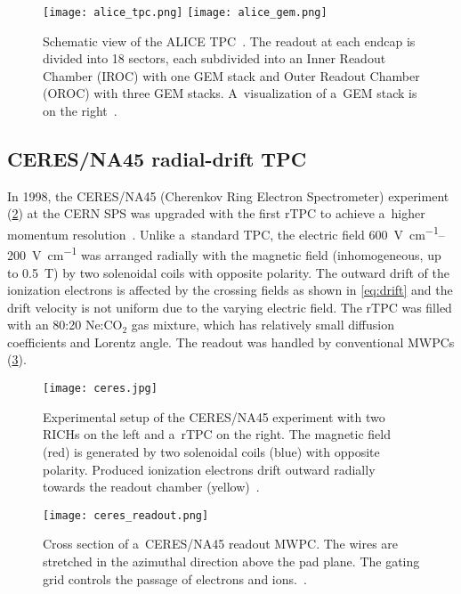 			\begin{figure}
				\centering
				\texttt{[image: alice\_tpc.png]}
				\hfill
				\texttt{[image: alice\_gem.png]}
				\caption{Schematic view of the ALICE \ac{TPC}~\cite{ALICE_upgrade2}. The readout at each endcap is divided into 18 sectors, each subdivided into an Inner Readout Chamber (IROC) with one \ac{GEM} stack and Outer Readout Chamber (OROC) with three \ac{GEM} stacks. A~visualization of a~\ac{GEM} stack is on the right~\cite{ALICE_gem}.}
				\label{fig:alice}
			\end{figure}
			
		\subsection{CERES/NA45 radial-drift TPC}
			In 1998, the CERES/NA45 (Cherenkov Ring Electron Spectrometer) experiment (\cref{fig:ceres}) at the CERN SPS was upgraded with the first \acf{rTPC} to achieve a~higher momentum resolution~\cite{ceres}. Unlike a~standard \ac{TPC}, the electric field \qtyrange{600}{200}{\V\per\cm} was arranged radially with the magnetic field (inhomogeneous, up to \qty{0.5}{\tesla}) by two solenoidal coils with opposite polarity. The outward drift of the ionization electrons is affected by the crossing fields as shown in \cref{eq:drift} and the drift velocity is not uniform due to the varying electric field. The \ac{rTPC} was filled with an 80:20 Ne:CO$_2$ gas mixture, which has relatively small diffusion coefficients and Lorentz angle. The readout was handled by conventional \acp{MWPC} (\cref{fig:ceres_readout}).
			
			\begin{figure}
				\centering
				\texttt{[image: ceres.jpg]}
				\caption{Experimental setup of the CERES/NA45 experiment with two \acfp{RICH} on the left and a~\ac{rTPC} on the right. The magnetic field (red) is generated by two solenoidal coils (blue) with opposite polarity. Produced ionization electrons drift outward radially towards the readout chamber (yellow)~\cite{ceres}.}
				\label{fig:ceres}
			\end{figure}
			\begin{figure}
				\centering
				\texttt{[image: ceres\_readout.png]}
				\caption{Cross section of a~CERES/NA45 readout \ac{MWPC}. The wires are stretched in the azimuthal direction above the pad plane. The gating grid controls the passage of electrons and ions.~\cite{ceres}.}
				\label{fig:ceres_readout}
			\end{figure}
			
